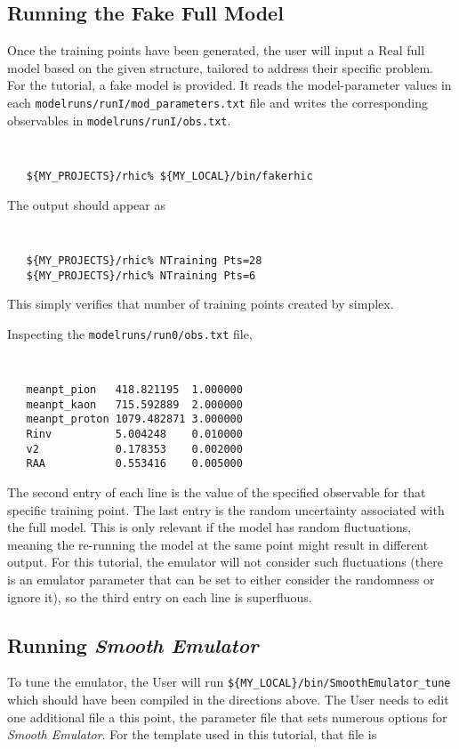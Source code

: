 \documentclass[UserManual.tex]{subfiles}
\begin{document}
\subsection{Running the Fake Full Model}
Once the training points have been generated, the user will input a Real full model based on the given structure, tailored to address their specific problem. For the tutorial, a fake model is provided. It reads the model-parameter values in each {\tt modelruns/runI/mod\_parameters.txt} file and writes the corresponding observables in {\tt modelruns/runI/obs.txt}. 

{\tt
\begin{verbatim}
   ${MY_PROJECTS}/rhic% ${MY_LOCAL}/bin/fakerhic
\end{verbatim}
}
The output should appear as
{\tt
\begin{verbatim}
   ${MY_PROJECTS}/rhic% NTraining Pts=28
   ${MY_PROJECTS}/rhic% NTraining Pts=6
\end{verbatim}
}
This simply verifies that number of training points created by simplex.

Inspecting the {\tt modelruns/run0/obs.txt} file,
{\tt
\begin{verbatim}
   meanpt_pion   418.821195  1.000000
   meanpt_kaon   715.592889  2.000000
   meanpt_proton 1079.482871 3.000000
   Rinv          5.004248    0.010000
   v2            0.178353    0.002000
   RAA           0.553416    0.005000
\end{verbatim}
}
The second entry of each line is the value of the specified observable for that specific training point. The last entry is the random uncertainty associated with the full model. This is only relevant if the model has random fluctuations, meaning the re-running the model at the same point might result in different output. For this tutorial, the emulator will not consider such fluctuations (there is an emulator parameter that can be set to either consider the randomness or ignore it), so the third entry on each line is superfluous.

\subsection{Running {\it Smooth Emulator}}
To tune the emulator, the User will run {\tt \$\{MY\_LOCAL\}/bin/SmoothEmulator\_tune} which should have been compiled in the directions above. The User needs to edit one additional file a this point, the parameter file that sets numerous options for {\it Smooth Emulator}. For the template used in this tutorial, that file is
\end{document}
